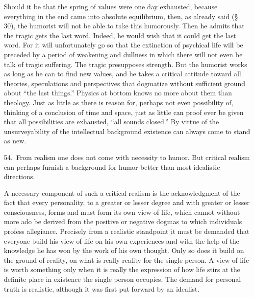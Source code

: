 \documentclass[12pt]{book}
\newcommand{\opage}[1]{\marginnote{\footnotesize\textit{[#1]}}}
\begin{document}
Should it be that the spring of values were one day exhausted, because everything in the end came into
absolute equilibrium, then, as already said (§ 30), the humorist will not be able to take this
humorously. Then he admits that the tragic gets the last word. Indeed, he would wish that it could
get the last word. For it will unfortunately go so that the extinction of psychical life will be
preceded by a period of weakening and dullness in which there will not even be talk of tragic
suffering. The tragic presupposes strength. But the humorist works as long as he can to find new
values, and he takes a critical attitude toward all theories, speculations and perspectives that
dogmatize without sufficient ground about ``the last things.'' Physics at bottom knows no more about
them than theology. Just as little as there is reason for, perhaps not even possibility of, thinking
of a conclusion of time and space, just as little can proof ever be given that all possibilities are
exhausted, ``all sounds closed.'' By virtue of the unsurveyability of the intellectual background
existence can always come to stand as new.

54.~From realism one does not come with necessity to humor. But critical realism can perhaps furnish
a background for humor better than most idealistic directions.

A necessary component of such a critical realism is the acknowledgment of the fact that every
personality, to a greater or lesser degree and with greater or lesser consciousness, forms and must
form its own view of life, which cannot without more ado be derived from the positive or negative
dogmas to which individuals profess allegiance. Precisely from a realistic standpoint it must be
demanded that everyone build his view of life on his own experiences and with the help of the
knowledge he has won by the work of his own thought. Only so does it build on the ground of reality,
on what is really reality for \opage{174}the single person. A view of life is worth something only
when it is really the expression of how life stirs at the definite place in existence the single
person occupies. The demand for personal truth is realistic, although it was first put forward by an
idealist.
\end{document}
